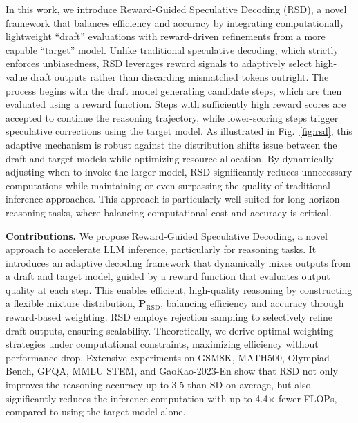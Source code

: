 \documentclass{article}
\theoremstyle{plain}
\theoremstyle{definition}
\theoremstyle{remark}
\newcommand{\JN}[1]{\textbf{\textcolor{blue}{[JN: #1]}}}
\begin{document}
In this work, we introduce Reward-Guided Speculative Decoding (RSD), a novel framework that balances efficiency and accuracy by integrating computationally lightweight “draft” evaluations with reward-driven refinements from a more capable “target” model. Unlike traditional speculative decoding, which strictly enforces unbiasedness, RSD leverages reward signals to adaptively select high-value draft outputs rather than discarding mismatched tokens outright. The process begins with the draft model generating candidate steps, which are then evaluated using a reward function. Steps with sufficiently high reward scores are accepted to continue the reasoning trajectory, while lower-scoring steps trigger speculative corrections using the target model. As illustrated in Fig.~\ref{fig:rsd}, this adaptive mechanism is robust against the distribution shifts issue between the draft and target models while optimizing resource allocation. By dynamically adjusting when to invoke the larger model, RSD significantly reduces unnecessary computations while maintaining or even surpassing the quality of traditional inference approaches. This approach is particularly well-suited for long-horizon reasoning tasks, where balancing computational cost and accuracy is critical.



\textbf{Contributions.}
We propose Reward-Guided Speculative Decoding, a novel approach to accelerate LLM inference, particularly for reasoning tasks. It introduces an adaptive decoding framework that dynamically mixes outputs from a draft and target model, guided by a reward function that evaluates output quality at each step. This enables efficient, high-quality reasoning by constructing a flexible mixture distribution, \(\mathbf{P}_{\text{RSD}}\), balancing efficiency and accuracy through reward-based weighting. RSD employs rejection sampling to selectively refine draft outputs, ensuring scalability. Theoretically, we derive optimal weighting strategies under computational constraints, maximizing efficiency without performance drop. Extensive experiments on GSM8K, MATH500, Olympiad Bench, GPQA, MMLU STEM, and GaoKao-2023-En show that RSD not only improves the reasoning accuracy up to 3.5 than SD on average, but also significantly reduces the inference computation with up to 4.4$\times$ fewer FLOPs, compared to using the target model alone.
\end{document}
